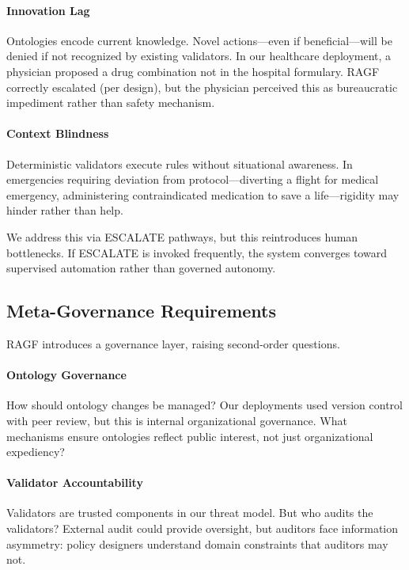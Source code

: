 \documentclass[sigconf,nonacm]{acmart}
\begin{document}
\paragraph{Innovation Lag} Ontologies encode current knowledge. Novel actions---even if beneficial---will be denied if not recognized by existing validators. In our healthcare deployment, a physician proposed a drug combination not in the hospital formulary. RAGF correctly escalated (per design), but the physician perceived this as bureaucratic impediment rather than safety mechanism.

\paragraph{Context Blindness} Deterministic validators execute rules without situational awareness. In emergencies requiring deviation from protocol---diverting a flight for medical emergency, administering contraindicated medication to save a life---rigidity may hinder rather than help.

We address this via ESCALATE pathways, but this reintroduces human bottlenecks. If ESCALATE is invoked frequently, the system converges toward supervised automation rather than governed autonomy.

\subsection{Meta-Governance Requirements}

RAGF introduces a governance layer, raising second-order questions.

\paragraph{Ontology Governance} How should ontology changes be managed? Our deployments used version control with peer review, but this is internal organizational governance. What mechanisms ensure ontologies reflect public interest, not just organizational expediency?

\paragraph{Validator Accountability} Validators are trusted components in our threat model. But who audits the validators? External audit could provide oversight, but auditors face information asymmetry: policy designers understand domain constraints that auditors may not.
\end{document}
